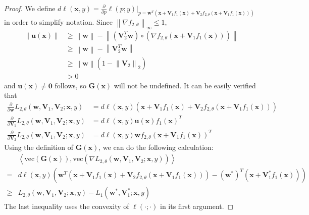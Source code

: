 \documentclass{article}
\theoremstyle{plain}
\theoremstyle{definition}
\newcommand{\norm}[1]{\left\lVert#1\right\rVert}
\newcommand{\dis}{\displaystyle}
\newcommand{\iprod}[2]{\left\langle #1,#2 \right\rangle}
\begin{document}
\begin{proof}
	We define $d\ell(\mathbf{x},y)=\dis\frac{\partial}{\partial p}\ell(p;y)\bigg|_{p=\mathbf{w}^T(\mathbf{x}+\mathbf{V}_1f_1(\mathbf{x})+\mathbf{V}_2f_{2,\theta}(\mathbf{x}+\mathbf{V}_1f_1(\mathbf{x})))}$ in order to simplify notation. Since $\norm{\nabla f_{2,\theta}}_\infty\leq 1$, 
	\begin{align*}
	\norm{\mathbf{u}(\mathbf{x})}&\geq\norm{\mathbf{w}}-\norm{\left(\mathbf{V}_2^T\mathbf{w}\right)\circ(\nabla f_{2,\theta}(\mathbf{x}+\mathbf{V}_1f_1(\mathbf{x})))}\\
	&\geq\norm{\mathbf{w}}-\norm{\mathbf{V}_2^T\mathbf{w}}\\
	&\geq\norm{\mathbf{w}}\left(1-\norm{\mathbf{V}_2}_2\right)\\
	&>0
	\end{align*}
	and $\mathbf{u}(\mathbf{x})\neq\mathbf{0}$ follows, so $\mathbf{G}(\mathbf{x})$ will not be undefined.
	It can be easily verified that
	\begin{align*}
	\frac{\partial}{\partial\mathbf{w}}L_{2,\theta}(\mathbf{w},\mathbf{V}_1,\mathbf{V}_2;\mathbf{x},y)&=d\ell(\mathbf{x},y)(\mathbf{x}+\mathbf{V}_1f_1(\mathbf{x})+\mathbf{V}_2f_{2,\theta}(\mathbf{x}+\mathbf{V}_1f_1(\mathbf{x})))\\
	\frac{\partial}{\partial\mathbf{V}_1}L_{2,\theta}(\mathbf{w},\mathbf{V}_1,\mathbf{V}_2;\mathbf{x},y)&=d\ell(\mathbf{x},y)\mathbf{u}(\mathbf{x})f_1(\mathbf{x})^T\\
	\frac{\partial}{\partial\mathbf{V}_2}L_{2,\theta}(\mathbf{w},\mathbf{V}_1,\mathbf{V}_2;\mathbf{x},y)&=d\ell(\mathbf{x},y)\mathbf{w}f_{2,\theta}(\mathbf{x}+\mathbf{V}_1f_1(\mathbf{x}))^T
	\end{align*}
	Using the definition of $\mathbf{G}(\mathbf{x})$, we can do the following calculation:
	\begin{align*}
	&\iprod{\text{vec}(\mathbf{G}(\mathbf{x}))}{\text{vec}\left(\nabla L_{2,\theta}(\mathbf{w},\mathbf{V}_1,\mathbf{V}_2;\mathbf{x},y)\right)}\\
	=&d\ell(\mathbf{x},y)\left(\mathbf{w}^T(\mathbf{x}+\mathbf{V}_1f_1(\mathbf{x})+\mathbf{V}_2f_{2,\theta}(\mathbf{x}+\mathbf{V}_1f_1(\mathbf{x})))-\left(\mathbf{w}^*\right)^T(\mathbf{x}+\mathbf{V}_1^*f_1(\mathbf{x}))\right)\\
	\geq &L_{2,\theta}(\mathbf{w},\mathbf{V}_1,\mathbf{V}_2;\mathbf{x},y)-L_1(\mathbf{w}^*,\mathbf{V}_1^*;\mathbf{x},y)
	\end{align*}
	The last inequality uses the convexity of $\ell(\cdot;\cdot)$ in its first argument.
\end{proof}
\end{document}
